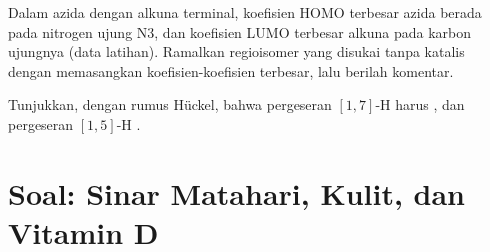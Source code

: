\begin{exercise}[$\star\star\star$]\label{exo:b3:pericyclic:11}
Dalam  azida dengan alkuna terminal, koefisien
HOMO terbesar azida berada pada nitrogen ujung N3, dan koefisien
LUMO terbesar alkuna pada karbon ujungnya (data latihan).
Ramalkan regioisomer yang disukai tanpa katalis dengan memasangkan koefisien-koefisien
terbesar, lalu berilah komentar.
\end{exercise}

\begin{exercise}[$\star\star\star$]\label{exo:b3:pericyclic:12}
Tunjukkan, dengan rumus Hückel, bahwa pergeseran $[1,7]$-H harus ,
dan pergeseran $[1,5]$-H .
\end{exercise}

\clearpage
\enlargethispage{3\baselineskip}
\section{Soal: Sinar Matahari, Kulit, dan Vitamin D}

